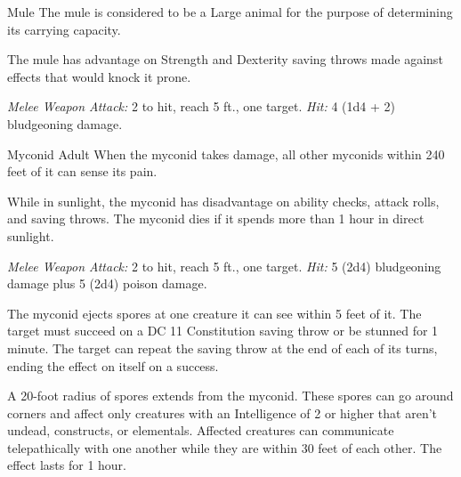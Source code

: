 \documentclass[10pt,a4paper,twoside,bg=print,twocolumn,openany,nodeprecatedcode]{dndbook}
\begin{document}
\begin{DndMonster}[float=t]{Mule}
\DndMonsterBasics[
armor-class = {10},
hit-points = {\DndDice{2d8 + 2}},
speed = {40 ft.}
]
\DndMonsterAbilityScores[
 str = 14,
 dex = 10,
 con = 13,
 int = 2,
 wis = 10,
 cha = 5
]
\DndMonsterDetails[
challenge = 1/8,
]
The mule is considered to be a Large animal for the purpose of determining its carrying capacity.

The mule has advantage on Strength and Dexterity saving throws made against effects that would knock it prone.

\textsl{Melee Weapon Attack:} 2 to hit, reach 5 ft., one target. \textsl{Hit:} 4 (1d4 + 2) bludgeoning damage.

\end{DndMonster}



\begin{DndMonster}[float=t]{Myconid Adult}
\DndMonsterBasics[
armor-class = {12 (natural armor)},
hit-points = {\DndDice{4d8 + 4}},
speed = {20 ft.}
]
\DndMonsterAbilityScores[
 str = 10,
 dex = 10,
 con = 12,
 int = 10,
 wis = 13,
 cha = 7
]
\DndMonsterDetails[
senses = {darkvision 120 ft., passive perception 11},
challenge = 1/2,
]
When the myconid takes damage, all other myconids within 240 feet of it can sense its pain.

While in sunlight, the myconid has disadvantage on ability checks, attack rolls, and saving throws. The myconid dies if it spends more than 1 hour in direct sunlight.

\textsl{Melee Weapon Attack:} 2 to hit, reach 5 ft., one target. \textsl{Hit:} 5 (2d4) bludgeoning damage plus 5 (2d4) poison damage.

The myconid ejects spores at one creature it can see within 5 feet of it. The target must succeed on a DC 11 Constitution saving throw or be stunned for 1 minute. The target can repeat the saving throw at the end of each of its turns, ending the effect on itself on a success.

A 20-foot radius of spores extends from the myconid. These spores can go around corners and affect only creatures with an Intelligence of 2 or higher that aren't undead, constructs, or elementals. Affected creatures can communicate telepathically with one another while they are within 30 feet of each other. The effect lasts for 1 hour.

\end{DndMonster}
\end{document}
